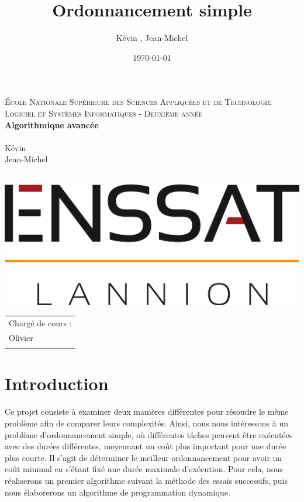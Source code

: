 \documentclass[a4paper, titlepage]{article}
\title{Ordonnancement simple}
\author{Kévin \bsc{Vythelingum}, Jean-Michel \bsc{Nokaya}}
\date{\today}           %
\begin{document}
\makeatletter
  \begin{titlepage}
  \centering
  	{\large \textsc{École Nationale Supérieure des Sciences Appliquées et de Technologie}}\\
	\textsc{Logiciel et Systèmes Informatiques - Deuxième année}\\
  \vfill
	\textbf{Algorithmique avancée}\\
  \vspace{1cm}
        {\LARGE \textbf{\@title}} \\
  \vspace{2em}
  {\large Kévin }\\
  \vspace{0.5cm}
  {\large Jean-Michel } \\
  \vspace{1cm}

	\@date \\
  \vfill
	\includegraphics[height=0.07\textheight]{enssat.png}
	\hfill
	\begin{tabular}{l}
		\large Chargé de cours :\\[0.2cm]
		\large Olivier \bsc{Pivert} \\
		\vspace{1cm}
	\end{tabular}

\end{titlepage}\makeatother
\tableofcontents
\newpage
\large

\section{Introduction}

Ce projet consiste à examiner deux manières différentes pour résoudre le même problème afin de comparer leurs complexités.
Ainsi, nous nous intéressons à un problème d'ordonnancement simple, où différentes tâches peuvent être exécutées avec des durées différentes, moyennant un coût plus important pour une durée plus courte.
Il s'agit de déterminer le meilleur ordonnancement pour avoir un coût minimal en s'étant fixé une durée maximale d'exécution.
Pour cela, nous réaliserons un premier algorithme suivant la méthode des essais successifs, puis nous élaborerons un algorithme de programmation dynamique.
\end{document}
